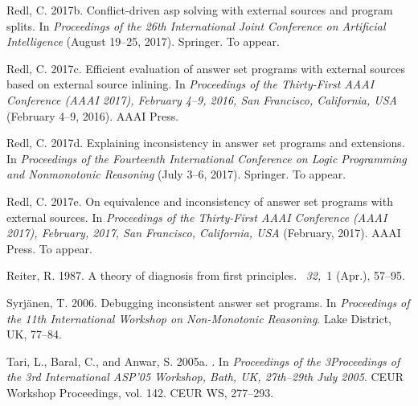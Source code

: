 \begin{thebibliography}{}
{\sc Redl, C.} 2017b.
\newblock Conflict-driven asp solving with external sources and program splits.
\newblock In {\em Proceedings of the 26th International Joint Conference on
  Artificial Intelligence} (August 19--25, 2017). Springer.
\newblock To appear.

{\sc Redl, C.} 2017c.
\newblock Efficient evaluation of answer set programs with external sources
  based on external source inlining.
\newblock In {\em Proceedings of the Thirty-First AAAI Conference (AAAI 2017),
  February 4--9, 2016, San Francisco, California, USA} (February 4--9, 2016).
  AAAI Press.

{\sc Redl, C.} 2017d.
\newblock Explaining inconsistency in answer set programs and extensions.
\newblock In {\em Proceedings of the Fourteenth International Conference on
  Logic Programming and Nonmonotonic Reasoning} (July 3--6, 2017). Springer.
\newblock To appear.

{\sc Redl, C.} 2017e.
\newblock On equivalence and inconsistency of answer set programs with external
  sources.
\newblock In {\em Proceedings of the Thirty-First AAAI Conference (AAAI 2017),
  February, 2017, San Francisco, California, USA} (February, 2017). AAAI Press.
\newblock To appear.

{\sc Reiter, R.} 1987.
\newblock A theory of diagnosis from first principles.
~{\em 32,\/}~1 (Apr.), 57--95.

{\sc Syrj\"anen, T.} 2006.
\newblock Debugging inconsistent answer set programs.
\newblock In {\em Proceedings of the 11th International Workshop on
  Non-Monotonic Reasoning}. Lake District, UK, 77--84.

{\sc Tari, L.}, {\sc Baral, C.}, {\sc and} {\sc Anwar, S.} 2005a.
.
\newblock In {\em Proceedings of the 3Proceedings of the 3rd International
  ASP'05 Workshop, Bath, UK, 27th--29th July 2005}. CEUR Workshop Proceedings,
  vol. 142. CEUR WS, 277--293.


\end{thebibliography}

